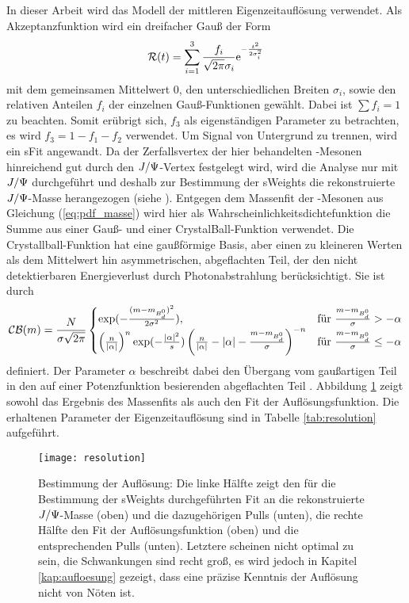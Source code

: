 In dieser Arbeit wird das Modell der mittleren Eigenzeitauflösung verwendet. Als Akzeptanzfunktion wird ein dreifacher Gauß der Form
\begin{align}
\mathcal{R}(t) = \sum_{i=1}^{3} \frac{f_i}{\sqrt{2\pi}\sigma_i}\mathrm{e}^{-\frac{t^2}{2\sigma_i^2}}
\end{align}
mit dem gemeinsamen Mittelwert $0$, den unterschiedlichen Breiten $\sigma_i$, sowie den relativen Anteilen $f_i$ der einzelnen Gauß-Funktionen gewählt. Dabei ist $\sum f_i = 1$ zu beachten. Somit erübrigt sich, $f_3$ als eigenständigen Parameter zu betrachten, es wird $f_3 = 1 - f_1 - f_2$ verwendet. Um Signal von Untergrund zu trennen, wird ein sFit angewandt. Da der Zerfallsvertex der hier behandelten \Bd-Mesonen hinreichend gut durch den $J/\Psi$-Vertex festgelegt wird, wird die Analyse nur mit $J/\Psi$ durchgeführt und deshalb zur Bestimmung der sWeights die rekonstruierte $J/\Psi$-Masse herangezogen (siehe \cite{lhcb-paper}). Entgegen dem Massenfit der \Bd-Mesonen aus Gleichung (\ref{eq:pdf_masse}) wird hier als Wahrscheinlichkeitsdichtefunktion die Summe aus einer Gauß- und einer CrystalBall-Funktion verwendet. Die Crystallball-Funktion hat eine gaußförmige Basis, aber einen zu kleineren Werten als dem Mittelwert hin asymmetrischen, abgeflachten Teil, der den nicht detektierbaren Energieverlust durch Photonabstrahlung berücksichtigt. Sie ist durch
\begin{align}
\mathcal{CB}(m) = \frac{N}{\sigma\sqrt{2\pi}} \begin{cases} \exp(-\frac{(m-m_{\text{$B_d^0$}})^2}{2\sigma^2}), & \text{für }\frac{m-m_{\text{$B_d^0$}}}{\sigma}>-\alpha \\ \left(\frac{n}{|\alpha|}\right)^n \exp(-\frac{|\alpha|^2}{s}) \left(\frac{n}{|\alpha|}-|\alpha|-\frac{m-m_{\text{$B_d^0$}}}{\sigma}\right)^{-n} & \text{für }\frac{m-m_{\text{$B_d^0$}}}{\sigma}\leq -\alpha \end{cases} 
\end{align}
definiert. Der Parameter $\alpha$ beschreibt dabei den Übergang vom gaußartigen Teil in den auf einer Potenzfunktion besierenden abgeflachten Teil \cite{crystal_ball}. Abbildung \ref{fig:resolution} zeigt sowohl das Ergebnis des Massenfits als auch den Fit der Auflösungsfunktion. Die erhaltenen Parameter der Eigenzeitauflösung sind in Tabelle \ref{tab:resolution} aufgeführt.
\begin{figure}[hptb]
\centering
\texttt{[image: resolution]}
\caption{Bestimmung der Auflösung: Die linke Hälfte zeigt den für die Bestimmung der sWeights durchgeführten Fit an die rekonstruierte $J/\Psi$-Masse (oben) und die dazugehörigen Pulls (unten), die rechte Hälfte den Fit der Auflösungsfunktion (oben) und die entsprechenden Pulls (unten). Letztere scheinen nicht optimal zu sein, die Schwankungen sind recht groß, es wird jedoch in Kapitel \ref{kap:aufloesung} gezeigt, dass eine präzise Kenntnis der Auflösung nicht von Nöten ist.}
\label{fig:resolution}
\end{figure}
